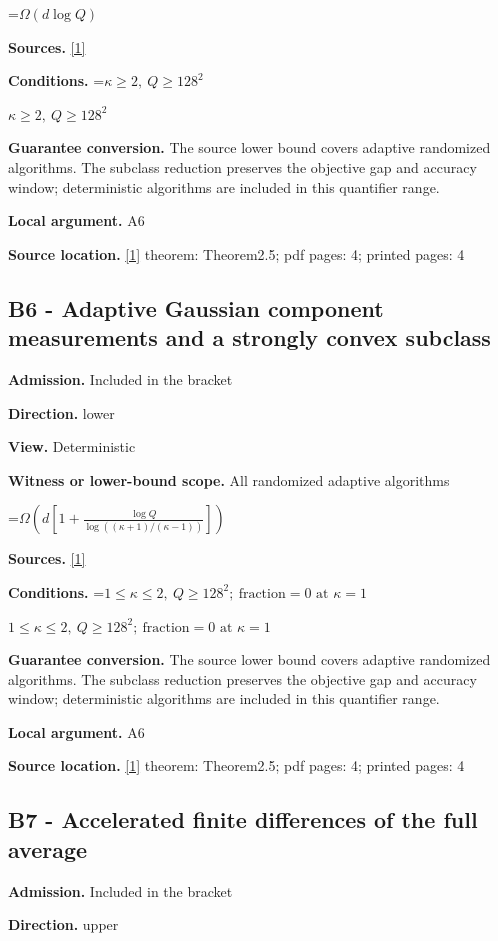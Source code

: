 \documentclass[10pt,a4paper]{article}
\newcommand{\AtlasMath}[1]{\par\begingroup\centering\setbox0=\hbox{$\displaystyle #1$}\ifdim\wd0>1.4\linewidth\typeout{ATLAS WIDE FORMULA: \the\wd0}\fi\ifdim\wd0>\linewidth\resizebox{\linewidth}{!}{\box0}\else\box0\fi\par\endgroup}
\newcommand{\AtlasInlineMath}[1]{\begingroup\setbox0=\hbox{$#1$}\ifdim\wd0>.4\linewidth\endgroup\AtlasMath{#1}\else\endgroup$#1$\fi}
\begin{document}
\AtlasMath{\Omega(d\log Q)}
\textbf{Sources.} \href{https://arxiv.org/html/2610.00345v1}{[1]}

\textbf{Conditions.} \AtlasInlineMath{\kappa\ge2,\ Q\ge128^2}

\textbf{Guarantee conversion.} The source lower bound covers adaptive randomized algorithms. The subclass reduction preserves the objective gap and accuracy window; deterministic algorithms are included in this quantifier range.

\textbf{Local argument.} A6

\textbf{Source location.} \href{https://arxiv.org/html/2610.00345v1}{[1]} theorem: Theorem2.5; pdf pages: 4; printed pages: 4

\subsection{B6 - Adaptive Gaussian component measurements and a strongly convex subclass}
\textbf{Admission.} Included in the bracket

\textbf{Direction.} lower

\textbf{View.} Deterministic

\textbf{Witness or lower-bound scope.} All randomized adaptive algorithms

\AtlasMath{\Omega\!\left(d\left[1+\frac{\log Q}{\log((\kappa+1)/(\kappa-1))}\right]\right)}
\textbf{Sources.} \href{https://arxiv.org/html/2610.00345v1}{[1]}

\textbf{Conditions.} \AtlasInlineMath{1\le\kappa\le2,\ Q\ge128^2;\ \text{fraction}=0\text{ at }\kappa=1}

\textbf{Guarantee conversion.} The source lower bound covers adaptive randomized algorithms. The subclass reduction preserves the objective gap and accuracy window; deterministic algorithms are included in this quantifier range.

\textbf{Local argument.} A6

\textbf{Source location.} \href{https://arxiv.org/html/2610.00345v1}{[1]} theorem: Theorem2.5; pdf pages: 4; printed pages: 4

\subsection{B7 - Accelerated finite differences of the full average}
\textbf{Admission.} Included in the bracket

\textbf{Direction.} upper
\end{document}
